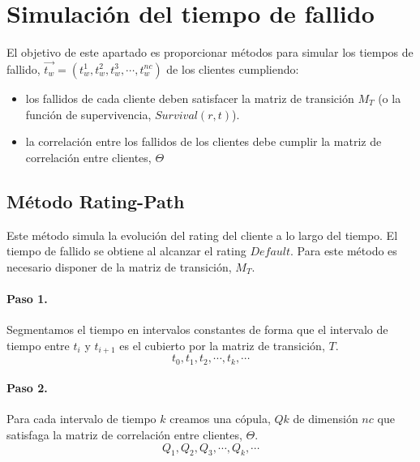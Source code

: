 
\section{Simulaci\'on del tiempo de fallido}

El objetivo de este apartado es proporcionar m\'etodos para simular los
tiempos de fallido, $\vec{t_w} = (t_w^1,t_w^2,t_w^3,\cdots,t_w^{nc})$ de los
clientes cumpliendo:
\begin{itemize}
\item los fallidos de cada cliente deben satisfacer la matriz de transici\'on $M_T$
(o la funci\'on de supervivencia, $Survival(r,t)$).
\item la correlaci\'on entre los fallidos de los clientes debe cumplir la matriz
de correlaci\'on entre clientes, $\Theta$
\end{itemize}

\subsection{M\'etodo Rating-Path}
\label{res:mrt}

Este m\'etodo simula la evoluci\'on del rating del cliente a lo largo del tiempo.
El tiempo de fallido se obtiene al alcanzar el rating $Default$. Para este m\'etodo
es necesario disponer de la matriz de transici\'on, $M_T$.

\paragraph{Paso 1.} Segmentamos el tiempo en intervalos constantes de forma que
el intervalo de tiempo entre $t_i$ y $t_{i+1}$ es el cubierto por la matriz de
transici\'on, $T$.
\begin{displaymath}
t_0,t_1,t_2,\cdots,t_k, \cdots
\end{displaymath}

\paragraph{Paso 2.} Para cada intervalo de tiempo $k$ creamos una c\'opula,
$Qk$ de dimensi\'on $nc$ que satisfaga la matriz de correlaci\'on entre
clientes, $\Theta$.
\begin{displaymath}
Q_1, Q_2, Q_3, \cdots, Q_k, \cdots
\end{displaymath}

